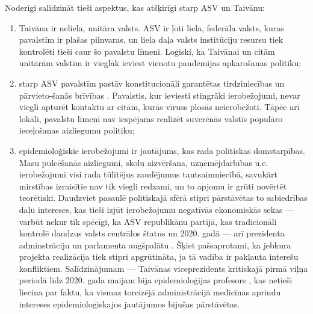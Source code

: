 \documentclass[12pt, a4paper]{article}
\numberwithin{equation}{section} %
\begin{document}
Noderīgi salīdzināt tieši aspektus, kas atšķirīgi starp ASV un Taivānu:

\begin{enumerate}
    \item Taivāna ir neliela, unitāra valsts. ASV ir ļoti liela, federāla valsts, kuras pavalstīm ir plašas pilnvaras, un liela daļa valsts institūciju resursu tiek kontrolēti tieši caur šo pavalstu līmeni. Loģiski, ka Taivānai un citām unitārām valstīm ir vieglāk ieviest vienotu pandēmijas apkarošanas politiku;
    \item starp ASV pavalstīm pastāv konstitucionāli garantētas tirdziniecības un pārvieto-šanās brīvības \cite{us_movement}. Pavalstis, kur ieviesti stingrāki ierobežojumi, nevar viegli apturēt kontaktu ar citām, kurās vīruss plosās neierobežoti. Tāpēc arī lokāli, pavalstu līmenī nav iespējams realizēt suverēnās valstīs populāro ieceļošanas aizliegumu politiku;
    \item epidemioloģiskie ierobežojumi ir jautājums, kas rada politiskas domstarpības. Masu pulcēšanās aizliegumi, skolu aizvēršana, uzņēmējdarbības u.c. ierobežojumi visi rada tūlītējus zaudējumus tautsaimniecībā, savukārt mirstības izraisītie nav tik viegli redzami, un to apjomu ir grūti novērtēt teorētiski. Daudzviet pasaulē politiskajā sfērā stipri pārstāvētas to sabiedrības daļu intereses, kas tieši izjūt ierobežojumu negatīvās ekonomiskās sekas --- varbūt nekur tik spēcīgi, ka ASV republikāņu partijā, kas tradicionāli kontrolē daudzus valsts centrālos štatus un 2020. gadā --- arī prezidenta adminstrāciju un parlamenta augšpalātu \cite{congress_2020}. Šķiet pašsaprotami, ka jebkura projekta realizācija tiek stipri apgrūtināta, ja tā vadība ir pakļauta interešu konfliktiem. Salīdzinājumam --- Taivānas viceprezidents kritiskajā pirmā viļņa periodā līdz 2020. gada maijam bija epidemioloģijas profesors \cite{taiwan_vp}, kas netieši liecina par faktu, ka vismaz toreizējā administrācijā medicīnas aprindu intereses epidemioloģiskajos jautājumos bijušas pārstāvētas.
\end{enumerate}
\end{document}
